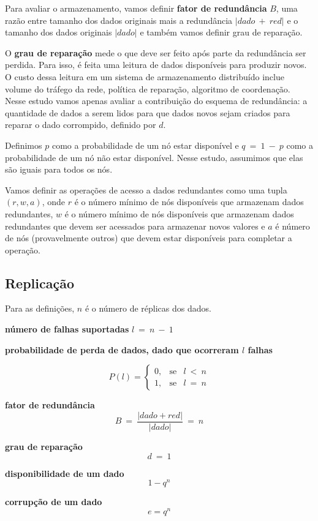 Para avaliar o armazenamento, vamos definir {\bf fator de redundância} $B$, uma razão entre tamanho dos dados originais mais a redundância $|dado\ +\ red|$ e o tamanho dos dados originais $|dado|$ e também vamos definir grau de reparação.

O {\bf grau de reparação} mede o que deve ser feito após parte da redundância ser perdida. Para isso, é feita uma leitura de dados disponíveis para produzir novos. O custo dessa leitura em um sistema de armazenamento distribuído inclue volume do tráfego da rede, política de reparação, algoritmo de coordenação. Nesse estudo vamos apenas avaliar a contribuição do esquema de redundância: a quantidade de dados a serem lidos para que dados novos sejam criados para reparar o dado corrompido, definido por $d$.

Definimos $p$ como a probabilidade de um nó estar disponível e  $q\ =\ 1\ -\ p$ como a probabilidade de um nó não estar disponível. Nesse estudo, assumimos que elas são iguais para todos os nós.

Vamos definir as operações de acesso a dados redundantes como uma tupla $(r, w, a)$, onde $r$ é o número mínimo de nós disponíveis que armazenam dados redundantes, $w$ é o número mínimo de nós disponíveis que armazenam dados redundantes que devem ser acessados para armazenar novos valores e $a$ é número de nós (provavelmente outros) que devem estar disponíveis para completar a operação.

\subsection{Replicação}

Para as definições, $n$ é o número de réplicas dos dados.

{\bf número de falhas suportadas} $l\ =\ n\ -\ 1$

{\bf probabilidade de perda de dados, dado que ocorreram $l$ falhas}

$$
P(l) = \left\{
\begin{array}{rcl}
0,& \mbox{se} & l\ <\ n\\
1,& \mbox{se} & l\ =\ n
\end{array}
\right.
$$

{\bf fator de redundância}
$$
B\ =\ \frac{|dado + red|}{|dado|}\ =\ n
$$

{\bf grau de reparação}
$$
d\ =\ 1
$$

{\bf disponibilidade de um dado}
$$
1 - q^n
$$

{\bf corrupção de um dado}
$$
e = q^n
$$

